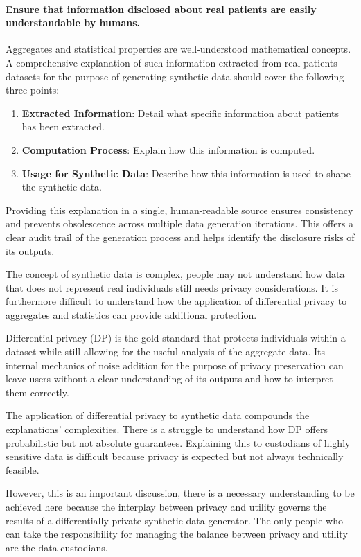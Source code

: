 \documentclass[11pt]{article}
\begin{document}
\paragraph{Ensure that information disclosed about real patients are easily understandable by humans.}

Aggregates and statistical properties are well-understood mathematical concepts. A comprehensive explanation of such information extracted from real patients datasets for the purpose of generating synthetic data should cover the following three points:

\begin{enumerate}
    \item \textbf{Extracted Information}: Detail what specific information about patients has been extracted.
    \item \textbf{Computation Process}: Explain how this information is computed.
    \item \textbf{Usage for Synthetic Data}: Describe how this information is used to shape the synthetic data.
\end{enumerate}

Providing this explanation in a single, human-readable source ensures consistency and prevents obsolescence across multiple data generation iterations. This offers a clear audit trail of the generation process and helps identify the disclosure risks of its outputs.

The concept of synthetic data is complex, people may not understand how data that does not represent real individuals still needs privacy considerations. It is furthermore difficult to understand how the application of differential privacy to aggregates and statistics can provide additional protection. 

Differential privacy (DP) \cite{DworkR14} is the gold standard that protects individuals within a dataset while still allowing for the useful analysis of the aggregate data. Its internal mechanics  of noise addition for the purpose of privacy preservation can leave users without a clear understanding of its outputs and how to interpret them correctly. 

The application of differential privacy to synthetic data compounds the explanations' complexities. There is a struggle to understand how DP offers probabilistic but not absolute guarantees. Explaining this to custodians of highly sensitive data is difficult because privacy is expected but not always technically feasible. 

However, this is an important discussion, there is a necessary understanding to be achieved here because the interplay between privacy and utility governs the results of a differentially private synthetic data generator. The only people who can take the responsibility for managing the balance between privacy and utility are the data custodians.
 
\end{document}
